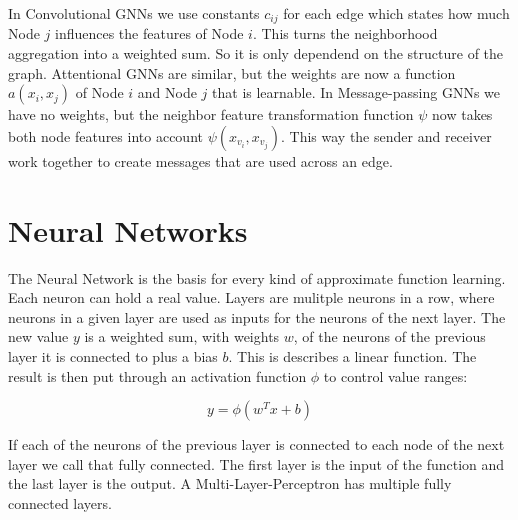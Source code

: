 In Convolutional GNNs we use constants $c_{ij}$ for each edge which states how much Node $j$ influences the features of Node $i$. This turns the neighborhood aggregation into a weighted sum. So it is only dependend on the structure of the graph. Attentional GNNs are similar, but the weights are now a function $a(x_i,x_j)$ of Node $i$ and Node $j$ that is learnable. In Message-passing GNNs we have no weights, but the neighbor feature transformation function $\psi$ now takes both node features into account $\psi(x_{v_i}, x_{v_j})$. This way the sender and receiver work together to create messages that are used across an edge.



\section{Neural Networks}
The Neural Network is the basis for every kind of approximate function learning. Each neuron can hold a real value. Layers are mulitple neurons in a row, where neurons in a given layer are used as inputs for the neurons of the next layer. The new value $y$ is a weighted  sum, with weights $w$, of the neurons of the previous layer it is connected to plus a bias $b$. This is describes a linear function. The result is then put through an activation function $\phi$ to control value ranges:

\begin{equation}
    y = \phi(w^T x + b) \nonumber
\end{equation} 

If each of the neurons of the previous layer is connected to each node of the next layer we call that fully connected. The first layer is the input of the function and the last layer is the output. A Multi-Layer-Perceptron has multiple fully connected layers.